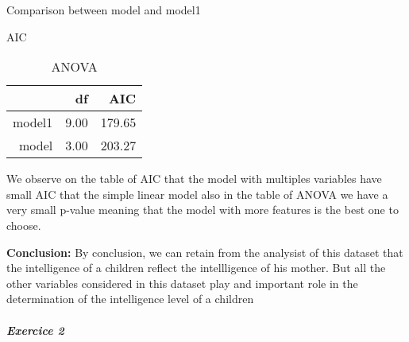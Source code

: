 \documentclass[12pt,a4paper]{article}
\begin{document}
\begin{enumerate}
\begin{table}[H]
	\caption{Comparison between model and model1}
	\begin{subtable}{.5\linewidth}
		\centering
		\caption{AIC}
		\begin{tabular}{rrr}
		\hline
		& df & AIC \\ 
		\hline
		model1 & 9.00 & 179.65 \\ 
		model & 3.00 & 203.27 \\ 
		\hline
		\end{tabular}
	\end{subtable} %
	\begin{subtable}{.5\linewidth}
		\centering
		\caption{ANOVA}
	\end{subtable} 
\end{table} 



We observe on the table of AIC that the model with multiples variables have small AIC that the simple linear model also in the table of ANOVA we have a very small p-value meaning that the model with more features is the best one to choose.\\
\end{enumerate}		
\textbf{Conclusion:} By conclusion, we can retain from the analysist of this dataset that the intelligence of a children reflect the intellligence of his mother. But all the other variables considered in this dataset play and important role in the determination of the intelligence level of a children\\\\



\textbf{\textit{Exercice 2}}
\end{document}
